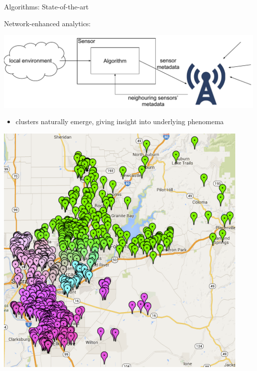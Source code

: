 \documentclass{beamer}
\begin{document}
     \begin{frame}{Algorithms: State-of-the-art}
        
        Network-enhanced analytics:
        \begin{center}
            \includegraphics[scale=0.3]{figures/data_fusion.pdf} \\
        \end{center}
        \begin{minipage}{0.5\linewidth}
            \begin{itemize}
                \item clusters naturally emerge, giving insight into underlying phenomema
            \end{itemize} 
        \end{minipage}
        \begin{minipage}{0.45\linewidth}
            \begin{center}
                \includegraphics[scale=0.3]{figures/network-enhanced.PNG}
            \end{center} 
        \end{minipage}
    \end{frame}
\end{document}
